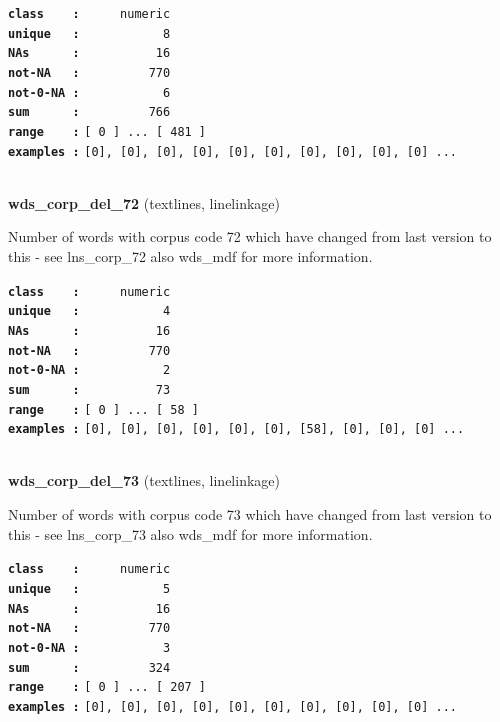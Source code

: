 \documentclass[]{article}
\begin{document}
\textbf{\texttt{class\ \ \ \ :}} \texttt{~~~~~numeric}\\
\textbf{\texttt{unique\ \ \ :}} \texttt{~~~~~~~~~~~8}\\
\textbf{\texttt{NAs\ \ \ \ \ \ :}} \texttt{~~~~~~~~~~16}\\
\textbf{\texttt{not-NA\ \ \ :}} \texttt{~~~~~~~~~770}\\
\textbf{\texttt{not-0-NA\ :}} \texttt{~~~~~~~~~~~6}\\
\textbf{\texttt{sum\ \ \ \ \ \ :}} \texttt{~~~~~~~~~766}\\
\textbf{\texttt{range\ \ \ \ :}}
\texttt{{[}\ 0\ {]}\ ...\ {[}\ 481\ {]}}\\
\textbf{\texttt{examples\ :}}
\texttt{{[}0{]},\ {[}0{]},\ {[}0{]},\ {[}0{]},\ {[}0{]},\ {[}0{]},\ {[}0{]},\ {[}0{]},\ {[}0{]},\ {[}0{]}\ ...}\\

~

\textbf{wds\_corp\_del\_72} (textlines, linelinkage)

Number of words with corpus code 72 which have changed from last version
to this - see lns\_corp\_72 also wds\_mdf for more information.

\textbf{\texttt{class\ \ \ \ :}} \texttt{~~~~~numeric}\\
\textbf{\texttt{unique\ \ \ :}} \texttt{~~~~~~~~~~~4}\\
\textbf{\texttt{NAs\ \ \ \ \ \ :}} \texttt{~~~~~~~~~~16}\\
\textbf{\texttt{not-NA\ \ \ :}} \texttt{~~~~~~~~~770}\\
\textbf{\texttt{not-0-NA\ :}} \texttt{~~~~~~~~~~~2}\\
\textbf{\texttt{sum\ \ \ \ \ \ :}} \texttt{~~~~~~~~~~73}\\
\textbf{\texttt{range\ \ \ \ :}}
\texttt{{[}\ 0\ {]}\ ...\ {[}\ 58\ {]}}\\
\textbf{\texttt{examples\ :}}
\texttt{{[}0{]},\ {[}0{]},\ {[}0{]},\ {[}0{]},\ {[}0{]},\ {[}0{]},\ {[}58{]},\ {[}0{]},\ {[}0{]},\ {[}0{]}\ ...}\\

~

\textbf{wds\_corp\_del\_73} (textlines, linelinkage)

Number of words with corpus code 73 which have changed from last version
to this - see lns\_corp\_73 also wds\_mdf for more information.

\textbf{\texttt{class\ \ \ \ :}} \texttt{~~~~~numeric}\\
\textbf{\texttt{unique\ \ \ :}} \texttt{~~~~~~~~~~~5}\\
\textbf{\texttt{NAs\ \ \ \ \ \ :}} \texttt{~~~~~~~~~~16}\\
\textbf{\texttt{not-NA\ \ \ :}} \texttt{~~~~~~~~~770}\\
\textbf{\texttt{not-0-NA\ :}} \texttt{~~~~~~~~~~~3}\\
\textbf{\texttt{sum\ \ \ \ \ \ :}} \texttt{~~~~~~~~~324}\\
\textbf{\texttt{range\ \ \ \ :}}
\texttt{{[}\ 0\ {]}\ ...\ {[}\ 207\ {]}}\\
\textbf{\texttt{examples\ :}}
\texttt{{[}0{]},\ {[}0{]},\ {[}0{]},\ {[}0{]},\ {[}0{]},\ {[}0{]},\ {[}0{]},\ {[}0{]},\ {[}0{]},\ {[}0{]}\ ...}\\
\end{document}
